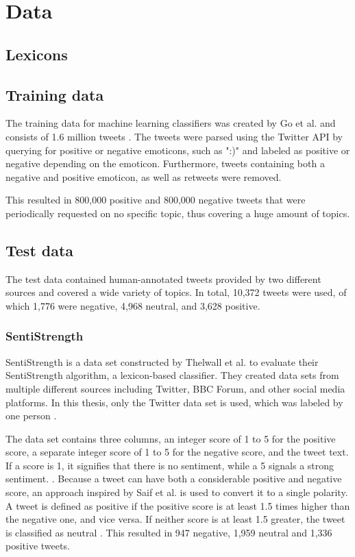 \section{Data}
\subsection{Lexicons}


\subsection{Training data}
The training data for machine learning classifiers was created by Go et al. and consists of 1.6 million tweets \cite{GoBHaHua2009}. The tweets were parsed using the Twitter API by querying for positive or negative emoticons, such as ":)" and labeled as positive or negative depending on the emoticon. Furthermore, tweets containing both a negative and positive emoticon, as well as retweets were removed.

This resulted in 800,000 positive and 800,000 negative tweets that were periodically requested on no specific topic, thus covering a huge amount of topics.
\subsection{Test data}

The test data contained human-annotated tweets provided by two different sources and covered a wide variety of topics. In total, 10,372 tweets were used, of which 1,776 were negative, 4,968 neutral, and 3,628 positive.

\subsubsection{SentiStrength}
SentiStrength is a data set constructed by Thelwall et al. to evaluate their SentiStrength algorithm, a lexicon-based classifier. They created data sets from multiple different sources including Twitter, BBC Forum, and other social media platforms. In this thesis, only the Twitter data set is used, which was labeled by one person \cite{10.1002/asi.21662}.

The data set contains three columns, an integer score of 1 to 5 for the positive score, a separate integer score of 1 to 5 for the negative score, and the tweet text. If a score is 1, it signifies that there is no sentiment, while a 5 signals a strong sentiment. \cite{10.1002/asi.21662}. Because a tweet can have both a considerable positive and negative score, an approach inspired by Saif et al. is used to convert it to a single polarity. A tweet is defined as positive if the positive score is at least 1.5 times higher than the negative one, and vice versa. If neither score is at least 1.5 greater, the tweet is classified as neutral \cite{oro40660}. This resulted in 947 negative, 1,959 neutral and 1,336 positive tweets.

